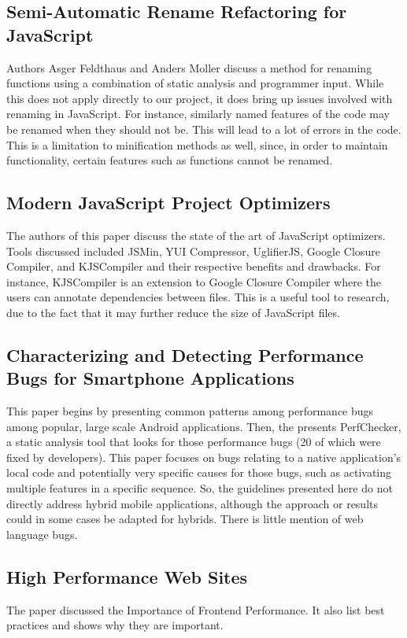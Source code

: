 \documentclass{acm_proc_article-sp}
\begin{document}
\subsection{Semi-Automatic Rename Refactoring for JavaScript\cite{feldthaus2013semi}}
Authors Asger Feldthaus and Anders Moller discuss a method for renaming functions using a combination of static analysis and programmer input.  While this does not apply directly to our project, it does bring up issues involved with renaming in JavaScript.  For instance, similarly named features of the code may be renamed when they should not be.  This will lead to a lot of errors in the code.  This is a limitation to minification methods as well, since, in order to maintain functionality, certain features such as functions cannot be renamed.

\subsection{Modern JavaScript Project Optimizers\cite{zolotareva2014modern} }
The authors of this paper discuss the state of the art of JavaScript optimizers.  Tools discussed included JSMin, YUI Compressor, UglifierJS, Google Closure Compiler, and KJSCompiler and their respective benefits and drawbacks.  For instance, KJSCompiler is an extension to Google Closure Compiler where the users can annotate dependencies between files.  This is a useful tool to research, due to the fact that it may further reduce the size of JavaScript files.

\subsection{Characterizing and Detecting Performance Bugs for Smartphone Applications\cite{liu2014characterizing} }
This paper begins by presenting common patterns among performance bugs among popular, large scale Android applications. Then, the presents PerfChecker, a static analysis tool that looks for those performance bugs (20 of which were fixed by developers). This paper focuses on bugs relating to a native application’s local code and potentially very specific causes for those bugs, such as activating multiple features in a specific sequence. So, the guidelines presented here do not directly address hybrid mobile applications, although the approach or results could in some cases be adapted for hybrids. There is little mention of web language bugs.

\subsection{High Performance Web Sites\cite{souders2008high}}
The paper discussed the Importance of Frontend Performance. It also list best practices and shows why they are important. 
\end{document}

